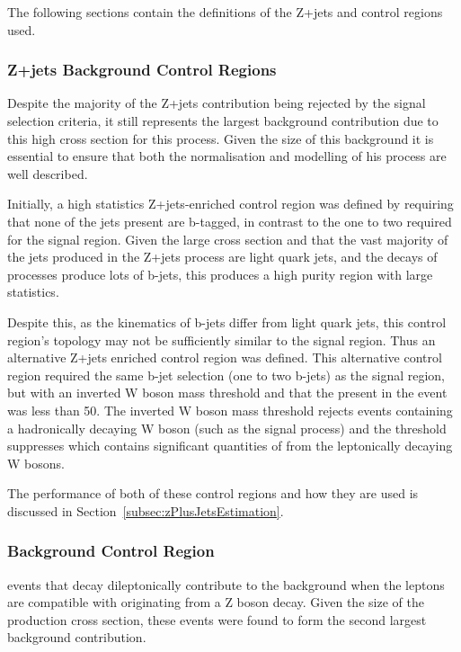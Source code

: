 The following sections contain the definitions of the Z+jets and \ttbar control regions used.

\subsubsection{Z+jets Background Control Regions}\label{subsec:zPlusJetsCR}
Despite the majority of the Z+jets contribution being rejected by the signal selection criteria, it still represents the largest background contribution due to this high cross section for this process.
Given the size of this background it is essential to ensure that both the normalisation and modelling of his process are well described.

Initially, a high statistics Z+jets-enriched control region was defined by requiring that none of the jets present are b-tagged, in contrast to the one to two required for the signal region.
Given the large cross section and that the vast majority of the jets produced in the Z+jets process are light quark jets, and the decays of \ttbar processes produce lots of b-jets, this produces a high purity region with large statistics.

Despite this, as the kinematics of b-jets differ from light quark jets, this control region's topology may not be sufficiently similar to the signal region.
Thus an alternative Z+jets enriched control region was defined.
This alternative control region required the same b-jet selection (one to two b-jets) as the signal region, but with an inverted W boson mass threshold and that the \MET present in the event was less than 50\GeV.
The inverted W boson mass threshold rejects events containing a hadronically decaying W boson (such as the signal process) and the \MET threshold suppresses \ttbar which contains significant quantities of \MET from the leptonically decaying W bosons.

The performance of both of these control regions and how they are used is discussed in Section~\ref{subsec:zPlusJetsEstimation}.

\subsubsection{\ttbar Background Control Region}\label{subsec:ttbarCR}
\ttbar events that decay dileptonically contribute to the background when the leptons are compatible with originating from a Z boson decay.
Given the size of the \ttbar production cross section, these events were found to form the second largest background contribution.

